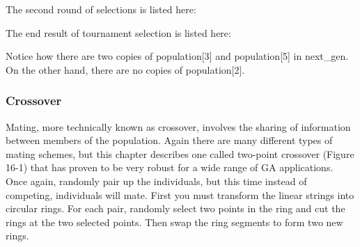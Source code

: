 The second round of selections is listed here:


The end result of tournament selection is listed here:


Notice how there are two copies of \textsf{population[3]} and
\textsf{population[5]} in \textsf{next\_gen}. On the other hand, there
are no copies of \textsf{population[2]}.

\subsubsection{Crossover}

Mating, more technically known as crossover, involves the sharing of
information between members of the population. Again there are many
different types of mating schemes, but this chapter describes one
called two-point crossover (Figure 16-1) that has proven to be very
robust for a wide range of GA applications. Once again, randomly pair
up the individuals, but this time instead of competing, individuals
will mate. First you must transform the linear strings into circular
rings. For each pair, randomly select two points in the ring and cut
the rings at the two selected points. Then swap the ring segments to
form two new rings.\\


